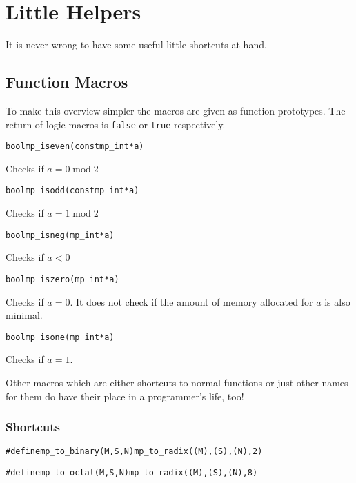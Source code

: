 \documentclass[synpaper]{book}
\begin{document}
\chapter{Little Helpers}
It is never wrong to have some useful little shortcuts at hand.
\section{Function Macros}
To make this overview simpler the macros are given as function prototypes. The return of logic
macros is \texttt{false} or \texttt{true} respectively.

\begin{alltt}
bool mp_iseven(const mp_int *a)
\end{alltt}
Checks if $a = 0 \;\mathrm{mod}\; 2$

\begin{alltt}
bool mp_isodd(const mp_int *a)
\end{alltt}
Checks if $a = 1 \;\mathrm{mod}\; 2$

\begin{alltt}
bool mp_isneg(mp_int *a)
\end{alltt}
Checks if $a < 0$

\begin{alltt}
bool mp_iszero(mp_int *a)
\end{alltt}
Checks if $a = 0$. It does not check if the amount of memory allocated for $a$ is also minimal.

\begin{alltt}
bool mp_isone(mp_int *a)
\end{alltt}
Checks if $a = 1$.

Other macros which are either shortcuts to normal functions or just other names for them do have
their place in a programmer's life, too!

\subsection{Shortcuts}

\begin{alltt}
#define mp_to_binary(M, S, N)  mp_to_radix((M), (S), (N), 2)
\end{alltt}

\begin{alltt}
#define mp_to_octal(M, S, N)   mp_to_radix((M), (S), (N), 8)
\end{alltt}
\end{document}
